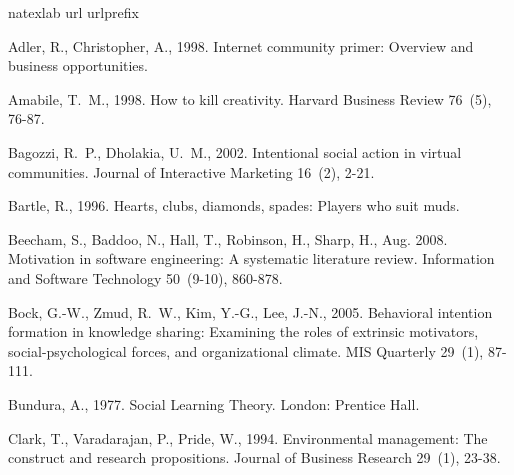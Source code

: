 \documentclass[doublespacing]{elsarticle}
\begin{document}

\begin{thebibliography}{52}
\expandafter\ifx\csname natexlab\endcsname\relax\def\natexlab#1{#1}\fi
\expandafter\ifx\csname url\endcsname\relax
  \def\url#1{\texttt{#1}}\fi
\expandafter\ifx\csname urlprefix\endcsname\relax\def\urlprefix{URL }\fi

Adler, R., Christopher, A., 1998. Internet community primer: Overview and
  business opportunities.


Amabile, T.~M., 1998. How to kill creativity. Harvard Business Review 76~(5),
  76-87.

Bagozzi, R.~P., Dholakia, U.~M., 2002. Intentional social action in virtual
  communities. Journal of Interactive Marketing 16~(2), 2-21.


Bartle, R., 1996. Hearts, clubs, diamonds, spades: Players who suit muds.


Beecham, S., Baddoo, N., Hall, T., Robinson, H., Sharp, H., Aug. 2008.
  Motivation in software engineering: A systematic literature review.
  Information and Software Technology 50~(9-10), 860-878.

Bock, G.-W., Zmud, R.~W., Kim, Y.-G., Lee, J.-N., 2005. Behavioral intention
  formation in knowledge sharing: Examining the roles of extrinsic motivators,
  social-psychological forces, and organizational climate. MIS Quarterly
  29~(1), 87-111.

Bundura, A., 1977. Social Learning Theory. London: Prentice Hall.

Clark, T., Varadarajan, P., Pride, W., 1994. {Environmental management: The
  construct and research propositions}. Journal of Business Research 29~(1),
  23-38.


\end{thebibliography}
\end{document}

